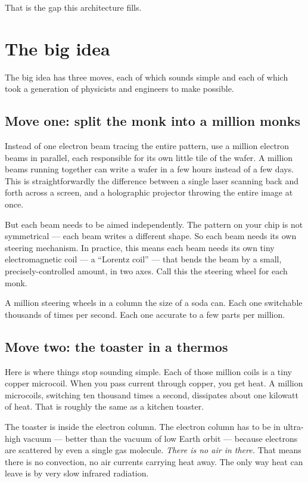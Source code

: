 \documentclass[11pt,letterpaper]{article}
\begin{document}
That is the gap this architecture fills.

\section{The big idea}

The big idea has three moves, each of which sounds simple and each of which took a generation of physicists and engineers to make possible.

\subsection{Move one: split the monk into a million monks}

Instead of one electron beam tracing the entire pattern, use a million electron beams in parallel, each responsible for its own little tile of the wafer. A million beams running together can write a wafer in a few hours instead of a few days. This is straightforwardly the difference between a single laser scanning back and forth across a screen, and a holographic projector throwing the entire image at once.

But each beam needs to be aimed independently. The pattern on your chip is not symmetrical --- each beam writes a different shape. So each beam needs its own steering mechanism. In practice, this means each beam needs its own tiny electromagnetic coil --- a ``Lorentz coil'' --- that bends the beam by a small, precisely-controlled amount, in two axes. Call this the steering wheel for each monk.

A million steering wheels in a column the size of a soda can. Each one switchable thousands of times per second. Each one accurate to a few parts per million.

\subsection{Move two: the toaster in a thermos}

Here is where things stop sounding simple. Each of those million coils is a tiny copper microcoil. When you pass current through copper, you get heat. A million microcoils, switching ten thousand times a second, dissipates about one kilowatt of heat. That is roughly the same as a kitchen toaster.

The toaster is inside the electron column. The electron column has to be in ultra-high vacuum --- better than the vacuum of low Earth orbit --- because electrons are scattered by even a single gas molecule. \emph{There is no air in there.} That means there is no convection, no air currents carrying heat away. The only way heat can leave is by very slow infrared radiation.
\end{document}
